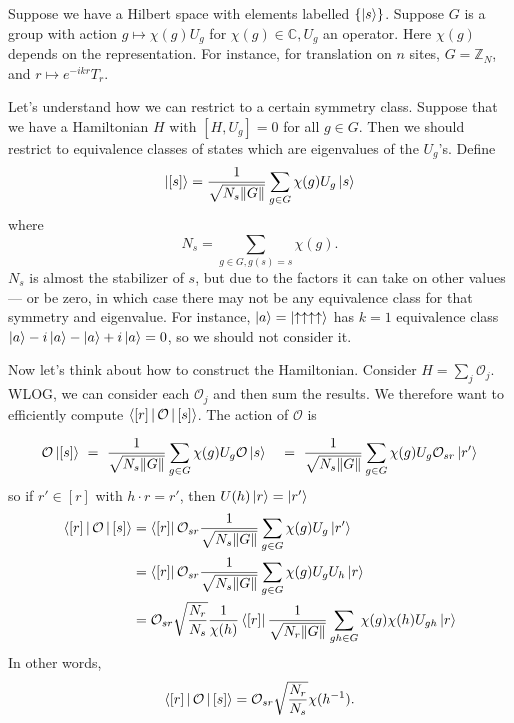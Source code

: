 \documentclass{article}
\begin{document}
Suppose we have a Hilbert space with elements labelled $\{\ket{s}\}$. Suppose $G$ is a group with action $g \mapsto \chi(g) U_g$ for $\chi(g) \in \mathbb{C}, U_g$ an operator. Here $\chi(g)$ depends on the representation. For instance, for translation on $n$ sites, $G = \mathbb{Z}_N$, and $r \mapsto e^{-i k r} T_r$.

Let's understand how we can restrict to a certain symmetry class. Suppose that we have a Hamiltonian $H$ with $[H,U_g] = 0$ for all $g \in G$. Then we should restrict to equivalence classes of states which are eigenvalues of the $U_g$'s. Define
\begin{equation}
	\ket{[s]} = \frac{1}{\sqrt{N_s \|G\|}} \sum_{g \in G} \chi(g) U_g\ket{s}
\end{equation}
where 
\begin{equation}
	N_s = \sum_{g \in G, g(s) = s} \chi(g).
\end{equation}
$N_s$ is almost the stabilizer of $s$, but due to the factors it can take on other values --- or be zero, in which case there may not be any equivalence class for that symmetry and eigenvalue. For instance, $\ket{a} = \ket{\uparrow\uparrow\uparrow\uparrow}$ has $k=1$ equivalence class $\ket{a} - i \ket{a} - \ket{a} + i \ket{a} = 0$, so we should not consider it.

Now let's think about how to construct the Hamiltonian. Consider $H = \sum_j \mathcal{O}_j$. WLOG, we can consider each $\mathcal{O}_j$ and then sum the results. We therefore want to efficiently compute $\Braket{[r]|\mathcal{O}|[s]}$. The action of $\mathcal{O}$ is 

\begin{align*}
	\mathcal{O} \ket{[s]}
	\ &=\ \frac{1}{\sqrt{N_s \|G\|}} \sum_{g \in G} \chi(g) U_g \mathcal{O} \ket{s}
	\ &=\ \frac{1}{\sqrt{N_s \|G\|}} \sum_{g \in G} \chi(g) U_g \mathcal{O}_{sr}\ket{r'}\\
\end{align*}
so if $r' \in [r]$ with $h\cdot r = r'$, then $U(h) \ket{r} = \ket{r'}$ 
\begin{align*}
	\Braket{[r]|\mathcal{O}|[s]}
	&= \Bra{[r]}\mathcal{O}_{sr} \frac{1}{\sqrt{N_s \|G\|}} \sum_{g \in G} \chi(g) U_g \ket{r'}\\
	&= \Bra{[r]} \mathcal{O}_{sr} \frac{1}{\sqrt{N_s \|G\|}} \sum_{g \in G} \chi(g) U_g U_h\ket{r}\\ 
	&= \mathcal{O}_{sr} \sqrt{\frac{N_r}{N_s}} \frac{1}{\chi(h)}\Bra{[r]}  \frac{1}{\sqrt{N_r \|G\|}} \sum_{gh \in G} \chi(g)\chi(h) U_{gh} \ket{r} 
\end{align*}
In other words,
\begin{equation}
	\Braket{[r]|\mathcal{O}|[s]} = \mathcal{O}_{sr} \sqrt{\frac{N_r}{N_s}} \chi(h^{-1}).
\end{equation}
\end{document}
